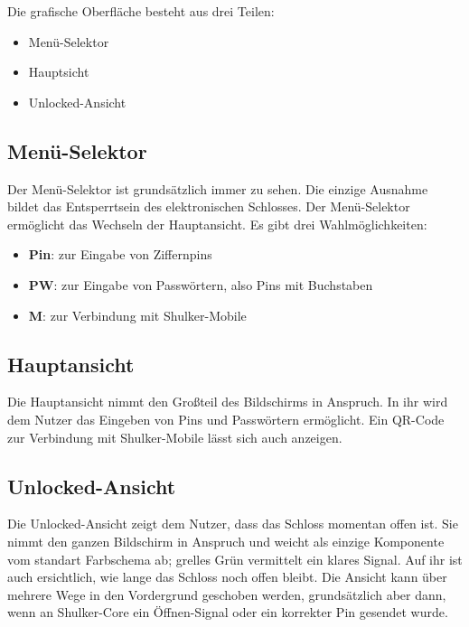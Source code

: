 Die grafische Oberfläche besteht aus drei Teilen:
\begin{itemize}
    \item Menü-Selektor
    \item Hauptsicht
    \item Unlocked-Ansicht
\end{itemize}

\subsection{Menü-Selektor}
Der Menü-Selektor ist grundsätzlich immer zu sehen. Die einzige Ausnahme bildet das Entsperrtsein des elektronischen
Schlosses. Der Menü-Selektor ermöglicht das Wechseln der Hauptansicht. Es gibt drei Wahlmöglichkeiten:
\begin{itemize}
    \item \textbf{Pin}: zur Eingabe von Ziffernpins
    \item \textbf{PW}: zur Eingabe von Passwörtern, also Pins mit Buchstaben
    \item \textbf{M}: zur Verbindung mit Shulker-Mobile
\end{itemize}

\subsection{Hauptansicht}
Die Hauptansicht nimmt den Großteil des Bildschirms in Anspruch. In ihr wird dem Nutzer das Eingeben von Pins und Passwörtern
ermöglicht. Ein QR-Code zur Verbindung mit Shulker-Mobile lässt sich auch anzeigen.

\subsection{Unlocked-Ansicht}
Die Unlocked-Ansicht zeigt dem Nutzer, dass das Schloss momentan offen ist. Sie nimmt den ganzen Bildschirm in Anspruch und weicht
als einzige Komponente vom standart Farbschema ab; grelles Grün vermittelt ein klares Signal. Auf ihr ist auch ersichtlich,
wie lange das Schloss noch offen bleibt. Die Ansicht kann über mehrere Wege in den Vordergrund geschoben werden, grundsätzlich aber dann,
wenn an Shulker-Core ein Öffnen-Signal oder ein korrekter Pin gesendet wurde.
